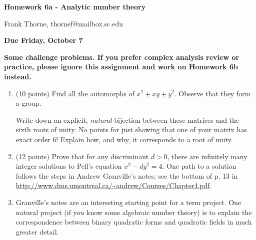 \documentclass[12pt]{article}
\begin{document}
\setlength{\topmargin}{-2mm}





\begin{center}{\bf Homework 6a - Analytic number theory}
\end{center}
\begin{center}Frank Thorne, thornef@mailbox.sc.edu
\end{center}
\begin{center}
{\bf Due Friday, October 7}
\end{center}
{\bf
Some challenge problems.
If you prefer complex analysis review or practice, please ignore this assignment and work on
Homework 6b instead.}

\begin{enumerate}
\item (10 points)
Find all the automorphs of $x^2 + xy + y^2$. Observe that they form a group.

Write down an explicit, {\itshape natural} bijection between these matrices and the sixth roots of unity.
No points for just showing that one of your matrix has exact order 6! Explain how, and why, it corresponds
to a root of unity.

\item (12 points)
Prove that for any discriminant $d > 0$, there are infinitely many integer solutions to Pell's equation
$x^2 - d y^2 = 4$. One path to a solution follows the steps in Andrew Granville's notes; see the bottom
of p. 13 in 
\url{http://www.dms.umontreal.ca/~andrew/Courses/Chapter4.pdf}.

\item
Granville's notes are an interesting starting point for a term project. One natural project (if you 
know some algebraic number theory) is to explain the correspondence between binary quadratic forms
and quadratic fields in much greater detail.

\end{enumerate}
\end{document}
